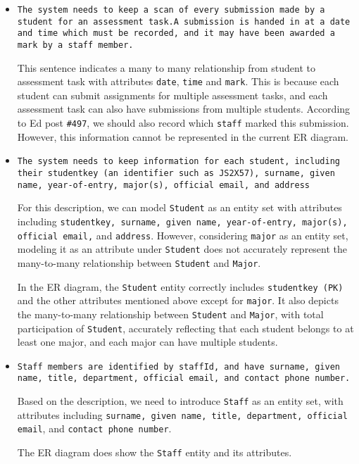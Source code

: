 \documentclass[a4paper,12pt]{article}
\begin{document}
\begin{itemize}
  \item \texttt{The system needs to keep a scan of every submission made by a student for an assessment task.A submission is handed in at a date and time which must be recorded, and it may have been awarded a mark by a staff member.}

  This sentence indicates a many to many relationship from student to assessment task with attributes \texttt{date}, \texttt{time} and \texttt{mark}. This is because each student can submit assignments for multiple assessment tasks, and each assessment task can also have submissions from multiple students. According to Ed post \texttt{\#497}, we should also record which \texttt{staff} marked this submission. However, this information cannot be represented in the current ER diagram.

  \item \texttt{The system needs to keep information for each student, including their studentkey (an identifier such as JS2X57), surname, given name, year-of-entry, major(s), official email, and address}

  For this description, we can model \texttt{Student} as an entity set with attributes including \texttt{studentkey, surname, given name, year-of-entry, major(s), official email,} and \texttt{address}. However, considering \texttt{major} as an entity set, modeling it as an attribute under \texttt{Student} does not accurately represent the many-to-many relationship between \texttt{Student} and \texttt{Major}.

  In the ER diagram, the \texttt{Student} entity correctly includes \texttt{studentkey (PK)} and the other attributes mentioned above except for \texttt{major}. It also depicts the many-to-many relationship between \texttt{Student} and \texttt{Major}, with total participation of \texttt{Student}, accurately reflecting that each student belongs to at least one major, and each major can have multiple students.

  \item \texttt{Staff members are identified by staffId, and have surname, given name, title, department, official email, and contact phone number. }

  Based on the description, we need to introduce \texttt{Staff} as an entity set, with attributes including \texttt{surname, given name, title, department, official email}, and \texttt{contact phone number}.

  The ER diagram does show the \texttt{Staff} entity and its attributes.


\end{itemize}
\end{document}
